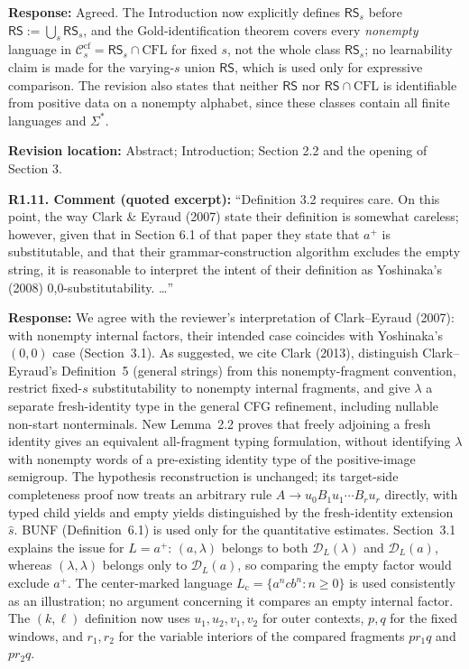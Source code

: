 \documentclass[
  10pt,
  a4paper,
]{article}
\begin{document}
\textbf{Response:} Agreed. The Introduction now explicitly defines
$\mathsf{RS}_s$ before
$\mathsf{RS}:=\bigcup_s\mathsf{RS}_s$, and the
Gold-identification theorem covers every \emph{nonempty} language in
$\mathcal C_s^{\mathrm{cf}}
=\mathsf{RS}_s\cap\mathrm{CFL}$ for fixed $s$, not the whole class
$\mathsf{RS}_s$; no learnability claim is made for the varying-$s$ union
$\mathsf{RS}$, which is used only for expressive comparison. The revision also states that neither
$\mathsf{RS}$ nor $\mathsf{RS}\cap\mathrm{CFL}$
is identifiable from positive data on a nonempty
alphabet, since these classes contain all finite
languages and $\Sigma^*$.

\textbf{Revision location:} Abstract; Introduction; Section 2.2 and the opening of Section 3.


\textbf{R1.11. Comment (quoted excerpt):} ``Definition 3.2 requires care. On
this point, the way Clark \& Eyraud (2007) state their definition is
somewhat careless; however, given that in Section 6.1 of that paper they
state that \(a^+\) is substitutable, and that their grammar-construction
algorithm excludes the empty string, it
is reasonable to interpret the intent of their definition as Yoshinaka's
(2008) 0,0-substitutability. \ldots{}''

\textbf{Response:} We agree with the reviewer's interpretation
of Clark--Eyraud (2007): with nonempty internal factors,
their intended case coincides with Yoshinaka's $(0,0)$ case
(Section~3.1). As suggested, we cite Clark (2013), distinguish
Clark--Eyraud's Definition~5 (general strings) from this nonempty-fragment
convention, restrict fixed-$s$ substitutability to nonempty internal
fragments, and give $\lambda$ a separate fresh-identity type in the
general CFG refinement, including nullable non-start nonterminals.
New Lemma~2.2 proves that freely adjoining a fresh identity gives an
equivalent all-fragment typing formulation, without identifying
$\lambda$ with nonempty words of a pre-existing identity type of the positive-image semigroup.
The hypothesis reconstruction is unchanged; its target-side completeness proof now treats an arbitrary rule $A\to u_0B_1u_1\cdots B_ru_r$ directly, with typed child yields and empty yields distinguished by the fresh-identity extension $\widehat s$. BUNF (Definition~6.1) is used only for the quantitative estimates.
Section~3.1 explains the issue for $L=a^+$:
$(a,\lambda)$ belongs to both $\mathcal D_L(\lambda)$
and $\mathcal D_L(a)$, whereas $(\lambda,\lambda)$
belongs only to $\mathcal D_L(a)$, so comparing the
empty factor would exclude $a^+$.
The center-marked language $L_{\mathrm c}=\{a^ncb^n:n\ge0\}$ is used
consistently as an illustration; no argument concerning it compares an
empty internal factor. The $(k,\ell)$ definition now uses
$u_1,u_2,v_1,v_2$ for outer contexts, $p,q$ for the fixed windows, and
$r_1,r_2$ for the variable interiors of the compared fragments $pr_1q$ and $pr_2q$.
\end{document}
